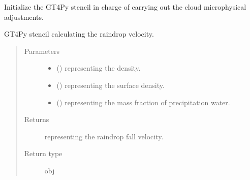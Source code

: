 \documentclass[letterpaper,10pt,english]{sphinxmanual}
\begin{document}
\begin{fulllineitems}

\begin{fulllineitems}
\label{\detokenize{api:parameterizations.adjustment_microphysics_kessler_wrf.AdjustmentMicrophysicsKesslerWRF._stencil_adjustment_initialize}}
Initialize the GT4Py stencil in charge of carrying out the cloud microphysical adjustments.

\end{fulllineitems}


\begin{fulllineitems}
\label{\detokenize{api:parameterizations.adjustment_microphysics_kessler_wrf.AdjustmentMicrophysicsKesslerWRF._stencil_raindrop_fall_velocity_defs}}
GT4Py stencil calculating the raindrop velocity.
\begin{quote}\begin{description}
\item[{Parameters}] \leavevmode\begin{itemize}
\item {} 
 () \textendash{}  representing the density.

\item {} 
 () \textendash{}  representing the surface density.

\item {} 
 () \textendash{}  representing the mass fraction of precipitation water.

\end{itemize}

\item[{Returns}] \leavevmode
{} representing the raindrop fall velocity.

\item[{Return type}] \leavevmode
obj


\end{description}
\end{quote}
\end{fulllineitems}
\end{fulllineitems}
\end{document}
